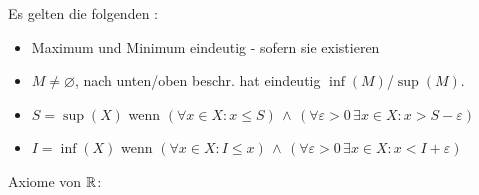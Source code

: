 \Satz
Es gelten die folgenden :
\vspace{-0.6em}
\begin{itemize}
    \item Maximum und Minimum eindeutig - sofern sie existieren
    \item $M\ne \varnothing$, nach unten/oben beschr. hat eindeutig $\inf(M)$/$\sup(M)$.
    \item $S = \sup(X)$ wenn $(\forall x \in X : x\le S) \, \land \, (\forall \varepsilon > 0 \, \exists x \in X : x > S - \varepsilon)$
    \item $I = \inf(X)$ wenn $(\forall x \in X : I\le x) \, \land \, (\forall \varepsilon > 0 \, \exists x \in X : x < I + \varepsilon)$
\end{itemize}

\Def Axiome von $\mathbb{R}$:
\vspace{-0.6em}

